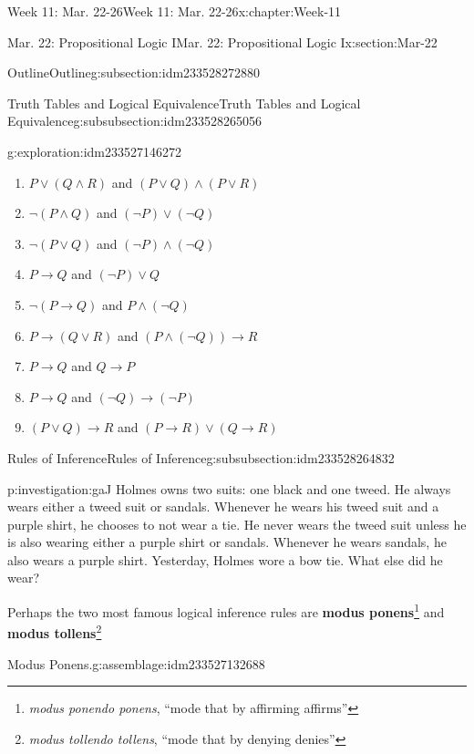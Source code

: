 \documentclass[oneside,10pt,]{book}
\newcommand{\tabularfont}{\relax}
\newcommand{\terminology}[1]{\textbf{#1}}
\numberwithin{equation}{section}
\newcommand{\hrulethin}  {\noalign{\hrule height 0.04em}}
\def\imp{\to}
\newcommand{\imp}{\rightarrow}
\begin{document}
\begin{chapterptx}{Week 11: Mar. 22-26}{}{Week 11: Mar. 22-26}{}{}{x:chapter:Week-11}
\begin{sectionptx}{Mar. 22: Propositional Logic I}{}{Mar. 22: Propositional Logic I}{}{}{x:section:Mar-22}
\begin{subsectionptx}{Outline}{}{Outline}{}{}{g:subsection:idm233528272880}
\begin{subsubsectionptx}{Truth Tables and Logical Equivalence}{}{Truth Tables and Logical Equivalence}{}{}{g:subsubsection:idm233528265056}
\begin{exploration}{}{g:exploration:idm233527146272}
\begin{enumerate}
\item{}\(P\lor (Q\land R)\) and \((P\lor Q) \land (P\lor R)\)%
\item{}\(\neg(P\land Q)\) and \((\neg P) \lor (\neg Q)\)%
\item{}\(\neg(P\lor Q)\) and \((\neg P) \land (\neg Q)\)%
\item{}\(P\imp Q\) and \((\neg P) \lor Q\)%
\item{}\(\neg (P\imp Q)\) and \(P\land (\neg Q)\)%
\item{}\(P\imp (Q\lor R)\) and \((P\land (\neg Q))\imp R\)%
\item{}\(P\imp Q\) and \(Q\imp P\)%
\item{}\(P\imp Q\) and \((\neg Q)\imp (\neg P)\)%
\item{}\((P\lor Q)\imp R\) and \((P\imp R)\lor (Q\imp R)\)%
\end{enumerate}
\end{exploration}%
\end{subsubsectionptx}
%
%
\typeout{************************************************}
\typeout{************************************************}
%
\begin{subsubsectionptx}{Rules of Inference}{}{Rules of Inference}{}{}{g:subsubsection:idm233528264832}
\begin{investigation}{}{p:investigation:gaJ}%
Holmes owns two suits: one black and one tweed. He always wears either a tweed suit or sandals. Whenever he wears his tweed suit and a purple shirt, he chooses to not wear a tie. He never wears the tweed suit unless he is also wearing either a purple shirt or sandals. Whenever he wears sandals, he also wears a purple shirt. Yesterday, Holmes wore a bow tie. What else did he wear?%
\end{investigation}%
Perhaps the two most famous logical inference rules are \terminology{modus ponens}\footnote{\emph{modus ponendo ponens}, ``mode that by affirming affirms''\label{g:fn:idm233527134896}} and \terminology{modus tollens}\footnote{\emph{modus tollendo tollens}, ``mode that by denying denies''\label{g:fn:idm233527133664}}%
\begin{assemblage}{Modus Ponens.}{g:assemblage:idm233527132688}%
\begin{sidebyside}{1}{0}{0}{0}%
\begin{sbspanel}{1}%
\resizebox{\linewidth}{!}{%
{\centering%
{\tabularfont%
\begin{tabular}{cc}
&\(P \imp Q\)\tabularnewline[0pt]
&\(P\)\tabularnewline\hrulethin

\end{tabular}}}}
\end{sbspanel}
\end{sidebyside}
\end{assemblage}
\end{subsubsectionptx}
\end{subsectionptx}
\end{sectionptx}
\end{chapterptx}
\end{document}
